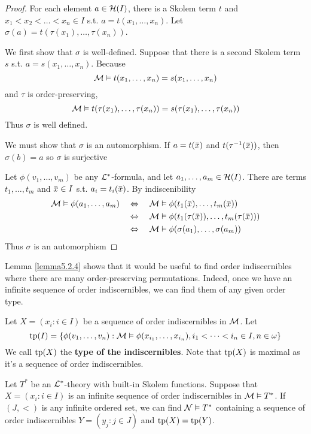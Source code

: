 \documentclass[11pt]{article}
\begin{document}
\begin{proof}
For each element \(a\in\mathcal{H}(I)\), there is a Skolem term \(t\) and \(x_1<x_2<\dots<x_n\in I\) s.t.
\(a=t(x_1,\dots,x_n)\). Let \(\sigma(a)=t(\tau(x_1),\dots,\tau(x_n))\).

We first show that \(\sigma\) is well-defined. Suppose that there is a second Skolem term \(s\)
s.t. \(a=s(x_1,\dots,x_n)\). Because
\begin{equation*}
\mathcal{M}\vDash t(x_1,\dots,x_n)=s(x_1,\dots,x_n)
\end{equation*}
and \(\tau\) is order-preserving,
\begin{equation*}
\mathcal{M}\vDash t(\tau(x_1),\dots,\tau(x_n))=s(\tau(x_1),\dots,\tau(x_n))
\end{equation*}
Thus \(\sigma\) is well defined.

We must show that \(\sigma\) is an automorphism. If \(a=t(\barx)\) and \(t(\tau^{-1}(\barx))\),
then \(\sigma(b)=a\) so \(\sigma\) is surjective

Let \(\phi(v_1,\dots,v_m)\) be any \(\mathcal{L}^*\)-formula, and let \(a_1,\dots,a_m\in\mathcal{H}(I)\). There are
terms \(t_1,\dots,t_m\) and \(\barx\in I\) s.t. \(a_i=t_i(\barx)\). By indiscenibility
\begin{align*}
\calm\vDash\phi(a_1,\dots,a_m)\quad&\Leftrightarrow\quad\calm\vDash\phi(t_1(\barx),\dots,t_m(\barx))\\
&\Leftrightarrow\quad\calm\vDash\phi(t_1(\tau(\barx)),\dots,t_m(\tau(\barx)))\\
&\Leftrightarrow\quad\calm\vDash\phi(\sigma(a_1),\dots,\sigma(a_m))
\end{align*}
Thus \(\sigma\) is an automorphism
\end{proof}

Lemma \ref{lemma5.2.4} shows that it would be useful to find order indiscernibles where there are
many order-preserving permutations. Indeed, once we have an infinite sequence of order
indiscernibles, we can find them of any given order type.

Let \(X=(x_i:i\in I)\) be a sequence of order indiscernibles in \(\mathcal{M}\). Let
\begin{equation*}
\operatorname{tp}(I)=\{\phi(v_1,\dots,v_n):\mathcal{M}\vDash\phi(x_{i_1},\dots,x_{i_n}),i_1<\dots<i_n\in I,n\in\omega\}
\end{equation*}
We call \(\operatorname{tp}(X)\) the \textbf{type of the indiscernibles}. Note that \(\operatorname{tp}(X)\) is maximal as it's a
sequence of order indiscernibles.

\begin{lemma}[]
\label{lemma5.2.5}
Let \(T^*\) be an \(\mathcal{L}^*\)-theory with built-in Skolem functions. Suppose that \(X=(x_i:i\in I)\) is
an infinite sequence of order indiscernibles in \(\mathcal{M}\vDash T^*\). If \((J,<)\) is any infinite ordered
set, we can find \(\mathcal{N}\vDash T^*\) containing a sequence of order indiscernibles \(Y=(y_j:j\in J)\)
and \(\operatorname{tp}(X)=\operatorname{tp}(Y)\).
\end{lemma}
\end{document}
